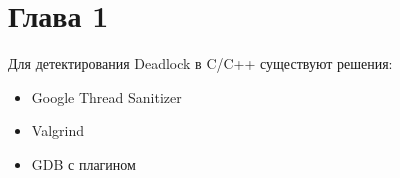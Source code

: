 
\section{Глава 1}

Для детектирования Deadlock в C/C++ существуют решения:
\begin{itemize}  
\item Google Thread Sanitizer
\item Valgrind
\item GDB с плагином
\end{itemize}

\clearpage